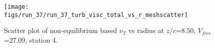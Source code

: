 \begin{figure}[H]
\centering
\texttt{[image: figs/run\_37/run\_37\_turb\_visc\_total\_vs\_r\_meshscatter]}
\caption{Scatter plot of non-equilibrium based $\nu_T$ vs radius at $z/c$=8.50, $V_{free}$=27.09, station 4.}
\label{fig:run_37_turb_visc_total_vs_r_meshscatter}
\end{figure}


